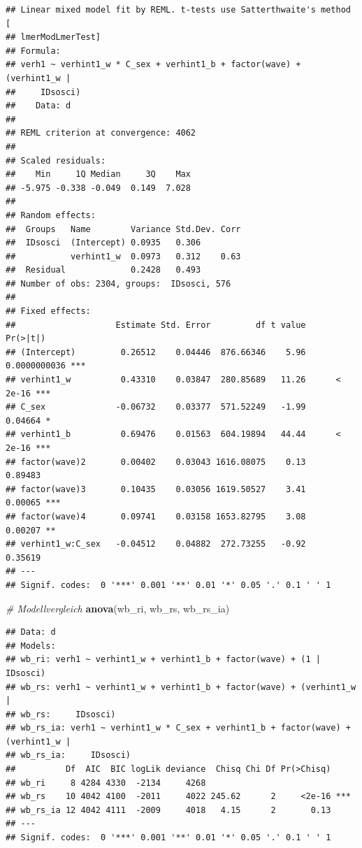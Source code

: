 \documentclass[
]{book}
\newenvironment{Shaded}{\begin{snugshade}}{\end{snugshade}}
\newcommand{\CommentTok}[1]{\textcolor[rgb]{0.56,0.35,0.01}{\textit{#1}}}
\newcommand{\KeywordTok}[1]{\textcolor[rgb]{0.13,0.29,0.53}{\textbf{#1}}}
\newcommand{\NormalTok}[1]{#1}
\begin{document}
\begin{verbatim}
## Linear mixed model fit by REML. t-tests use Satterthwaite's method [
## lmerModLmerTest]
## Formula: 
## verh1 ~ verhint1_w * C_sex + verhint1_b + factor(wave) + (verhint1_w |  
##     IDsosci)
##    Data: d
## 
## REML criterion at convergence: 4062
## 
## Scaled residuals: 
##    Min     1Q Median     3Q    Max 
## -5.975 -0.338 -0.049  0.149  7.028 
## 
## Random effects:
##  Groups   Name        Variance Std.Dev. Corr
##  IDsosci  (Intercept) 0.0935   0.306        
##           verhint1_w  0.0973   0.312    0.63
##  Residual             0.2428   0.493        
## Number of obs: 2304, groups:  IDsosci, 576
## 
## Fixed effects:
##                    Estimate Std. Error         df t value     Pr(>|t|)    
## (Intercept)         0.26512    0.04446  876.66346    5.96 0.0000000036 ***
## verhint1_w          0.43310    0.03847  280.85689   11.26      < 2e-16 ***
## C_sex              -0.06732    0.03377  571.52249   -1.99      0.04664 *  
## verhint1_b          0.69476    0.01563  604.19894   44.44      < 2e-16 ***
## factor(wave)2       0.00402    0.03043 1616.08075    0.13      0.89483    
## factor(wave)3       0.10435    0.03056 1619.50527    3.41      0.00065 ***
## factor(wave)4       0.09741    0.03158 1653.82795    3.08      0.00207 ** 
## verhint1_w:C_sex   -0.04512    0.04882  272.73255   -0.92      0.35619    
## ---
## Signif. codes:  0 '***' 0.001 '**' 0.01 '*' 0.05 '.' 0.1 ' ' 1
\end{verbatim}

\begin{Shaded}
\begin{Highlighting}[]
\CommentTok{# Modellvergleich}
\KeywordTok{anova}\NormalTok{(wb_ri, wb_rs, wb_rs_ia)}
\end{Highlighting}
\end{Shaded}

\begin{verbatim}
## Data: d
## Models:
## wb_ri: verh1 ~ verhint1_w + verhint1_b + factor(wave) + (1 | IDsosci)
## wb_rs: verh1 ~ verhint1_w + verhint1_b + factor(wave) + (verhint1_w | 
## wb_rs:     IDsosci)
## wb_rs_ia: verh1 ~ verhint1_w * C_sex + verhint1_b + factor(wave) + (verhint1_w | 
## wb_rs_ia:     IDsosci)
##          Df  AIC  BIC logLik deviance  Chisq Chi Df Pr(>Chisq)    
## wb_ri     8 4284 4330  -2134     4268                             
## wb_rs    10 4042 4100  -2011     4022 245.62      2     <2e-16 ***
## wb_rs_ia 12 4042 4111  -2009     4018   4.15      2       0.13    
## ---
## Signif. codes:  0 '***' 0.001 '**' 0.01 '*' 0.05 '.' 0.1 ' ' 1
\end{verbatim}
\end{document}
